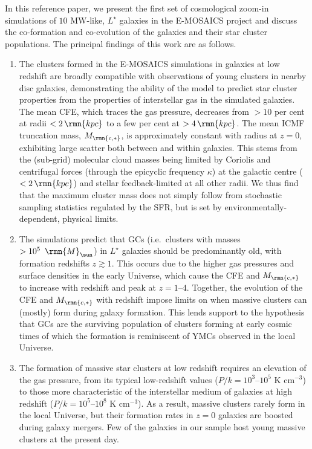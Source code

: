 \documentclass[fleqn,usenatbib]{mnras}
\newcommand\Msun{\,\rmn{M}_{\sun}}
\newcommand\kpc{\,\rmn{kpc}}
\newcommand{\numgal}{10}
\newcommand{\Mcstar}{M_\rmn{c,\ast}}
\begin{document}
In this reference paper, we present the first set of cosmological zoom-in simulations of $\numgal$ MW-like, $L^\star$ galaxies in the E-MOSAICS project and discuss the co-formation and co-evolution of the galaxies and their star cluster populations. The principal findings of this work are as follows.
\begin{enumerate}
\item The clusters formed in the E-MOSAICS simulations in galaxies at low redshift are broadly compatible with observations of young clusters in nearby disc galaxies, demonstrating the ability of the model to predict star cluster properties from the properties of interstellar gas in the simulated galaxies. The mean CFE, which traces the gas pressure, decreases from $>10$ per cent at radii $<2 \kpc$ to a few per cent at $>4 \kpc$. The mean ICMF truncation mass, $\Mcstar$, is approximately constant with radius at $z=0$, exhibiting large scatter both between and within galaxies. This stems from the (sub-grid) molecular cloud masses being limited by Coriolis and centrifugal forces (through the epicyclic frequency $\kappa$) at the galactic centre ($<2\kpc$) and stellar feedback-limited at all other radii. We thus find that the maximum cluster mass does not simply follow from stochastic sampling statistics regulated by the SFR, but is set by environmentally-dependent, physical limits.

\item The simulations predict that GCs (i.e.~clusters with masses $>10^5~\Msun$) in $L^\star$ galaxies should be predominantly old, with formation redshifts $z \gtrsim 1$. This occurs due to the higher gas pressures and surface densities in the early Universe, which cause the CFE and $\Mcstar$ to increase with redshift and peak at $z=1$--$4$. Together, the evolution of the CFE and $\Mcstar$ with redshift impose limits on when massive clusters can (mostly) form during galaxy formation. This lends support to the hypothesis that GCs are the surviving population of clusters forming at early cosmic times of which the formation is reminiscent of YMCs observed in the local Universe.

\item The formation of massive star clusters at low redshift requires an elevation of the gas pressure, from its typical low-redshift values  ($P/k=10^3$--$10^5$ K cm$^{-3}$) to those more characteristic of the interstellar medium of galaxies at high redshift ($P/k=10^5$--$10^8$ K cm$^{-3}$). As a result, massive clusters rarely form in the local Universe, but their formation rates in $z=0$ galaxies are boosted during galaxy mergers. Few of the galaxies in our sample host young massive clusters at the present day.


\end{enumerate}
\end{document}
